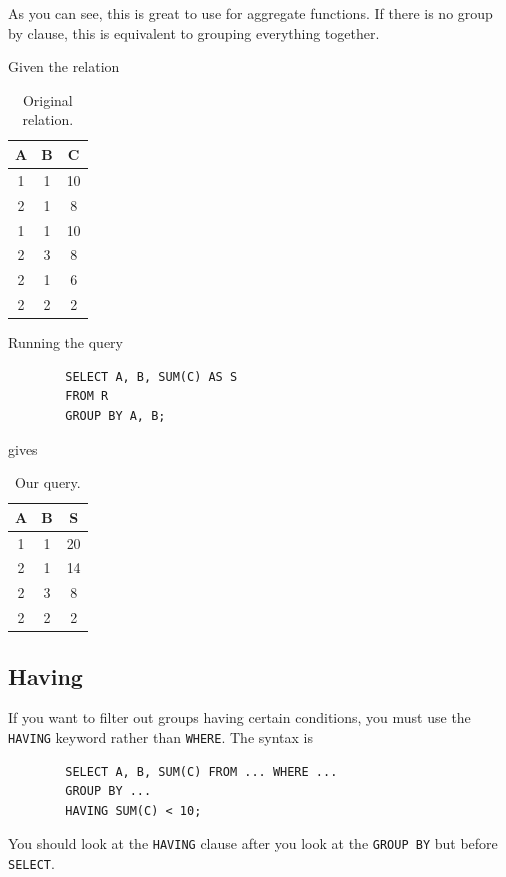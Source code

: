 \documentclass{article}
\begin{document}
    As you can see, this is great to use for aggregate functions. If there is no group by clause, this is equivalent to grouping everything together.  

    \begin{example}
      Given the relation 

      \begin{table}[H]
        \centering
        \begin{tabular}{|c|c|c|}
          \hline
          \textbf{A} & \textbf{B} & \textbf{C} \\
          \hline
          1 & 1 & 10 \\ 
          2 & 1 & 8 \\ 
          1 & 1 & 10 \\ 
          2 & 3 & 8 \\ 
          2 & 1 & 6 \\ 
          2 & 2 & 2 \\ 
          \hline
        \end{tabular}
        \caption{Original relation. }
        \label{tab:groupby}
      \end{table}
    
      Running the query 
      \begin{lstlisting}
        SELECT A, B, SUM(C) AS S 
        FROM R 
        GROUP BY A, B; 
      \end{lstlisting}
      gives 
      
      \begin{table}[H]
        \centering
        \begin{tabular}{|c|c|c|}
          \hline
          \textbf{A} & \textbf{B} & \textbf{S} \\
          \hline
          1 & 1 & 20 \\ 
          2 & 1 & 14 \\ 
          2 & 3 & 8 \\ 
          2 & 2 & 2 \\ 
          \hline
        \end{tabular}
        \caption{Our query. }
        \label{tab:groupby_output}
      \end{table}
    \end{example}

  \subsection{Having} 

    \begin{definition}
      If you want to filter out groups having certain conditions, you must use the \texttt{HAVING} keyword rather than \texttt{WHERE}. The syntax is 
      \begin{lstlisting}
        SELECT A, B, SUM(C) FROM ... WHERE ... 
        GROUP BY ... 
        HAVING SUM(C) < 10; 
      \end{lstlisting}
      You should look at the \texttt{HAVING} clause after you look at the \texttt{GROUP BY} but before \texttt{SELECT}. 
    \end{definition}
\end{document}
